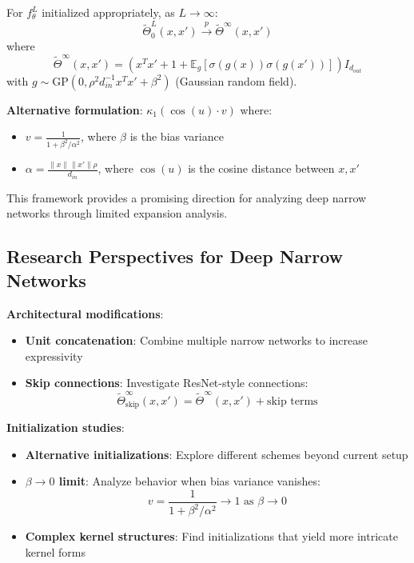 \documentclass[a4paper]{article}
\newcommand{\E}{\mathbb{E}}
\begin{document}
\begin{theorem}
For $f^L_\theta$ initialized appropriately, as $L \to \infty$:
\[ \tilde{\Theta}^L_0(x, x') \xrightarrow{p} \tilde{\Theta}^\infty(x, x') \]
where
\[ \tilde{\Theta}^\infty(x, x') = (x^T x' + 1 + \E_g[\sigma(g(x))\sigma(g(x'))]) I_{d_{out}} \]
with $g \sim \text{GP}(0, \rho^2 d_{in}^{-1} x^T x' + \beta^2)$ (Gaussian random field).
\end{theorem}

\textbf{Alternative formulation}: $\kappa_1(\cos(u) \cdot v)$ where:
\begin{itemize}
\item $v = \frac{1}{1 + \beta^2/\alpha^2}$, where $\beta$ is the bias variance
\item $\alpha = \frac{\|x\| \|x'\| \rho}{d_{in}}$, where $\cos(u)$ is the cosine distance between $x, x'$
\end{itemize}

This framework provides a promising direction for analyzing deep narrow networks through limited expansion analysis.

\subsection{Research Perspectives for Deep Narrow Networks}

\textbf{Architectural modifications}:
   \begin{itemize}
\item \textbf{Unit concatenation}: Combine multiple narrow networks to increase expressivity
\item \textbf{Skip connections}: Investigate ResNet-style connections:
  \[ \tilde{\Theta}^\infty_{\text{skip}}(x, x') = \tilde{\Theta}^\infty(x, x') + \text{skip terms} \]
   \end{itemize}

\textbf{Initialization studies}:
\begin{itemize}
\item \textbf{Alternative initializations}: Explore different schemes beyond current setup
\item \textbf{$\beta \to 0$ limit}: Analyze behavior when bias variance vanishes:
  \[ v = \frac{1}{1 + \beta^2/\alpha^2} \to 1 \text{ as } \beta \to 0 \]
\item \textbf{Complex kernel structures}: Find initializations that yield more intricate kernel forms
\end{itemize}
\end{document}
